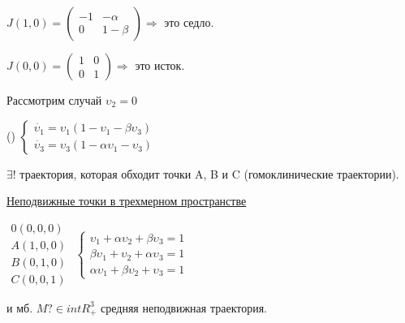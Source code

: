 \documentclass{article}
\begin{document}
\vspace{0.5cm}
\(
 J(1,0) = 
 \begin{pmatrix}
 -1 & -\alpha \\ 
 0 & 1 - \beta
 \end{pmatrix}
\)\hspace{0.5cm}\(\Rightarrow\) это седло.

\vspace{0.5cm}
\(
 J(0,0) = 
 \begin{pmatrix}
 1 & 0\\
 0 & 1
 \end{pmatrix}
\)\hspace{0.5cm}\(\Rightarrow\) это исток.

\newpage
Рассмотрим случай { \underline{\(\upsilon_2 = 0\)}}

\vspace{0.5cm}
({})
\(
 \begin{cases}
 	\dot{\upsilon_1} = \upsilon_1(1-\upsilon_1 - \beta\upsilon_3)
 	\\
 	\dot{\upsilon_3} = \upsilon_3(1-\alpha\upsilon_1 - \upsilon_3)
 \end{cases}
\)

\vspace{0.5cm}
\(\exists!\) траектория, которая обходит точки  A, B и C
(гомоклинические траектории).

\vspace{0.5cm}
{\underline{Неподвижные точки в трехмерном пространстве}}

\vspace{0.5cm}
\(
 \begin{matrix}
 0(0,0,0)\\
 A(1,0,0)\\
 B(0,1,0)\\
 C(0,0,1)
 \end{matrix}
\)\hspace{2cm}
\(
 \begin{cases}
 	\upsilon_1 + \alpha\upsilon_2 + \beta\upsilon_3 = 1
 	\\
 	\beta\upsilon_1 + \upsilon_2 + \alpha\upsilon_3 = 1
 	\\
 	\alpha\upsilon_1 + \beta\upsilon_2 + \upsilon_3 = 1
 \end{cases}
\)

\vspace{0.5cm}
и мб. \(M ? \in intR_+^3\) средняя неподвижная траектория.
\end{document}
